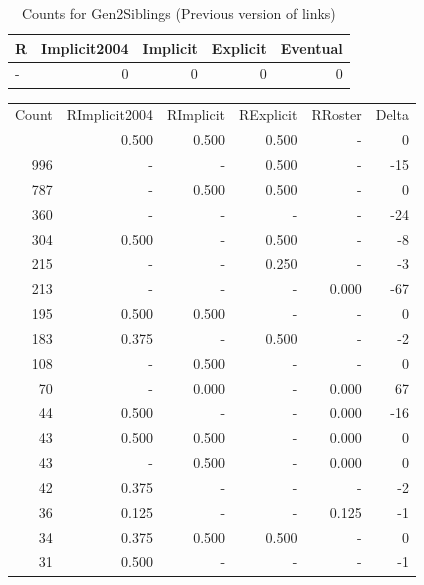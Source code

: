 \documentclass[a4paper]{article}\usepackage{graphicx, color}
\begin{document}
\begin{table}[ht]
\centering
{\large
\begin{tabular}{lrrrr}
  \hline
R & Implicit2004 & Implicit & Explicit & Eventual \\ 
  \hline
- &   0 &   0 &   0 &   0 \\ 
   \hline
\end{tabular}
}
\caption{Counts for Gen2Siblings (Previous version of links)} 
\end{table}



\begin{table}[ht]
\centering
\begin{tabular}{rrrrrr}
  \hline
Count & RImplicit2004 & RImplicit & RExplicit & RRoster & Delta \\ 
  \rowcolor{goodColor}  \hline
1192 & 0.500 & 0.500 & 0.500 & - & 0 \\ 
   \rowcolor{sosoColor} 996 & - & - & 0.500 & - & -15 \\ 
   \rowcolor{goodColor} 787 & - & 0.500 & 0.500 & - & 0 \\ 
   \rowcolor{nullColor} 360 & - & - & - & - & -24 \\ 
   \rowcolor{sosoColor} 304 & 0.500 & - & 0.500 & - & -8 \\ 
   \rowcolor{sosoColor} 215 & - & - & 0.250 & - & -3 \\ 
   \rowcolor{nullColor} 213 & - & - & - & 0.000 & -67 \\ 
  195 & 0.500 & 0.500 & - & - & 0 \\ 
   \rowcolor{sosoColor} 183 & 0.375 & - & 0.500 & - & -2 \\ 
  108 & - & 0.500 & - & - & 0 \\ 
  70 & - & 0.000 & - & 0.000 & 67 \\ 
   \rowcolor{nullColor} 44 & 0.500 & - & - & 0.000 & -16 \\ 
  43 & 0.500 & 0.500 & - & 0.000 & 0 \\ 
  43 & - & 0.500 & - & 0.000 & 0 \\ 
   \rowcolor{nullColor} 42 & 0.375 & - & - & - & -2 \\ 
   \rowcolor{nullColor} 36 & 0.125 & - & - & 0.125 & -1 \\ 
   \rowcolor{goodColor} 34 & 0.375 & 0.500 & 0.500 & - & 0 \\ 
   \rowcolor{nullColor} 31 & 0.500 & - & - & - & -1 \\ 

\end{tabular}
\end{table}
\end{document}
